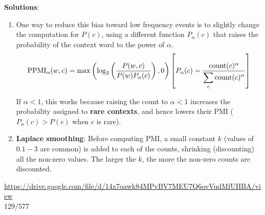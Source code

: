 \textbf{Solutions}:
\begin{enumerate}
    \item One way to reduce this bias toward low frequency events is to slightly change the computation for $P(c)$, using a different function $P_\alpha(c)$ that raises the probability of the context word to the power of $\alpha$.
    \[
        \displaystyle \rcmdXPPMI_\alpha(w, c) = \max\left(\log_2\left(\frac{P(w, c)}{P(w)P_\alpha(c)}\right),0\right) \hfill \left[ P_\alpha(c) = \frac{\rcmdXcount(c)^\alpha}{\displaystyle\sum_c \rcmdXcount(c)^\alpha} \right]
    \]
    
    If $\alpha < 1$, this works because raising the count to $\alpha < 1$ increases the probability assigned to \textbf{rare contexts}, and hence lowers their PMI ($P_\alpha(c) > P(c)$ when $c$ is rare).

    \item \textbf{Laplace smoothing}: Before computing PMI, a small constant $k$ (values of $0.1-3$ are common) is added to each of the counts, shrinking (discounting) all the non-zero values. The larger the $k$, the more the non-zero counts are discounted.
    
\end{enumerate}


















\vspace{4cm}
\url{https://drive.google.com/file/d/14x7oawk84MPvBV7MEU7Q6ovVudMfUHBA/view}\\
129/577




























































